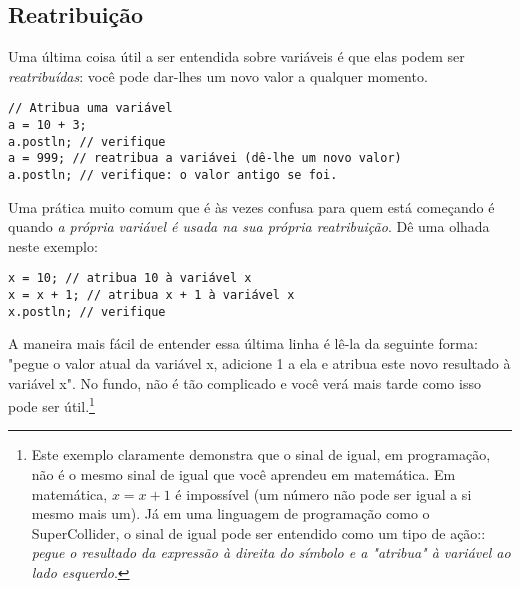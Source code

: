 \subsection{Reatribuição}

Uma última coisa útil a ser entendida sobre variáveis é que elas podem ser \emph{reatribuídas}: você pode dar-lhes um novo valor a qualquer momento.

\begin{lstlisting}[style=SuperCollider-IDE, basicstyle=\scttfamily\footnotesize]
// Atribua uma variável
a = 10 + 3;
a.postln; // verifique
a = 999; // reatribua a variávei (dê-lhe um novo valor)
a.postln; // verifique: o valor antigo se foi.
\end{lstlisting}

Uma prática muito comum que é às vezes confusa para quem está começando é quando \emph{a própria variável é usada na sua própria reatribuição}. Dê uma olhada neste exemplo:

\begin{lstlisting}[style=SuperCollider-IDE, basicstyle=\scttfamily\footnotesize]
x = 10; // atribua 10 à variável x
x = x + 1; // atribua x + 1 à variável x
x.postln; // verifique
\end{lstlisting}

A maneira mais fácil de entender essa última linha é lê-la da seguinte forma: "pegue o valor atual da variável x, adicione 1 a ela e atribua este novo resultado à variável x". No fundo, não é tão complicado e você verá mais tarde como isso pode ser útil.\footnote{Este exemplo claramente demonstra que o sinal de igual, em programação, não é o mesmo sinal de igual que você aprendeu em matemática. Em matemática, $x = x + 1$ é impossível (um número não pode ser igual a si mesmo mais um). Já em uma linguagem de programação como o SuperCollider, o sinal de igual pode ser entendido como um tipo de ação:: \emph{pegue o resultado da expressão à direita do símbolo e a "atribua" à variável ao lado esquerdo}.}

